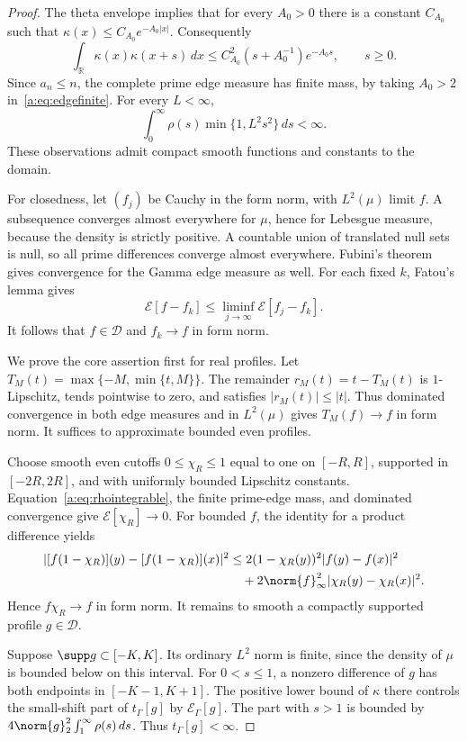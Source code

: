 \documentclass[11pt,a4paper]{article}
\numberwithin{equation}{section}
\theoremstyle{definition}\newtheorem{definition}[theorem]{Definition}
\theoremstyle{remark}\newtheorem{remark}[theorem]{Remark}
\newcommand{\R}{\mathbb R}\newcommand{\C}{\mathbb C}\newcommand{\N}{\mathbb N}
\newcommand{\E}{\mathcal E}\newcommand{\D}{\mathcal D}
\newcommand{\tg}{t_\Gamma}\newcommand{\cg}{c_\Gamma}
\begin{document}
\begin{proof}
The theta envelope implies that for every $A_0>0$ there is a constant $C_{A_0}$ such that $\kappa(x)\le C_{A_0}e^{-A_0|x|}$. Consequently
\begin{equation}\label{a:eq:edgefinite}
 \int_\R\kappa(x)\kappa(x+s)\,dx
 \le C_{A_0}^2(s+A_0^{-1})e^{-A_0s},\qquad s\ge0.
\end{equation}
Since $a_n\le n$, the complete prime edge measure has finite mass, by taking $A_0>2$ in~\eqref{a:eq:edgefinite}. For every $L<\infty$,
\begin{equation}\label{a:eq:rhointegrable}
 \int_0^\infty\rho(s)\min\{1,L^2s^2\}\,ds<\infty.
\end{equation}
These observations admit compact smooth functions and constants to the domain.

For closedness, let $(f_j)$ be Cauchy in the form norm, with $L^2(\mu)$ limit $f$. A subsequence converges almost everywhere for $\mu$, hence for Lebesgue measure, because the density is strictly positive. A countable union of translated null sets is null, so all prime differences converge almost everywhere. Fubini's theorem gives convergence for the Gamma edge measure as well. For each fixed $k$, Fatou's lemma gives
\[
 \E[f-f_k]\le\liminf_{j\to\infty}\E[f_j-f_k].
\]
It follows that $f\in\D$ and $f_k\to f$ in form norm.

We prove the core assertion first for real profiles. Let $T_M(t)=\max\{-M,\min\{t,M\}\}$. The remainder $r_M(t)=t-T_M(t)$ is $1$-Lipschitz, tends pointwise to zero, and satisfies $|r_M(t)|\le|t|$. Thus dominated convergence in both edge measures and in $L^2(\mu)$ gives $T_M(f)\to f$ in form norm. It suffices to approximate bounded even profiles.

Choose smooth even cutoffs $0\le\chi_R\le1$ equal to one on $[-R,R]$, supported in $[-2R,2R]$, and with uniformly bounded Lipschitz constants. Equation~\eqref{a:eq:rhointegrable}, the finite prime-edge mass, and dominated convergence give $\E[\chi_R]\to0$. For bounded $f$, the identity for a product difference yields
\begin{align*}
 |[f(1-\chi_R)](y)-[f(1-\chi_R)](x)|^2
 &\le2(1-\chi_R(y))^2|f(y)-f(x)|^2\\
 &\quad+2\norm{f}_\infty^2|\chi_R(y)-\chi_R(x)|^2.
\end{align*}
Hence $f\chi_R\to f$ in form norm. It remains to smooth a compactly supported profile $g\in\D$.

Suppose $\supp g\subset[-K,K]$. Its ordinary $L^2$ norm is finite, since the density of $\mu$ is bounded below on this interval. For $0<s\le1$, a nonzero difference of $g$ has both endpoints in $[-K-1,K+1]$. The positive lower bound of $\kappa$ there controls the small-shift part of $\tg[g]$ by $\E_\Gamma[g]$. The part with $s>1$ is bounded by $4\norm{g}_2^2\int_1^\infty\rho(s)\,ds$. Thus $\tg[g]<\infty$.


\end{proof}
\end{document}
